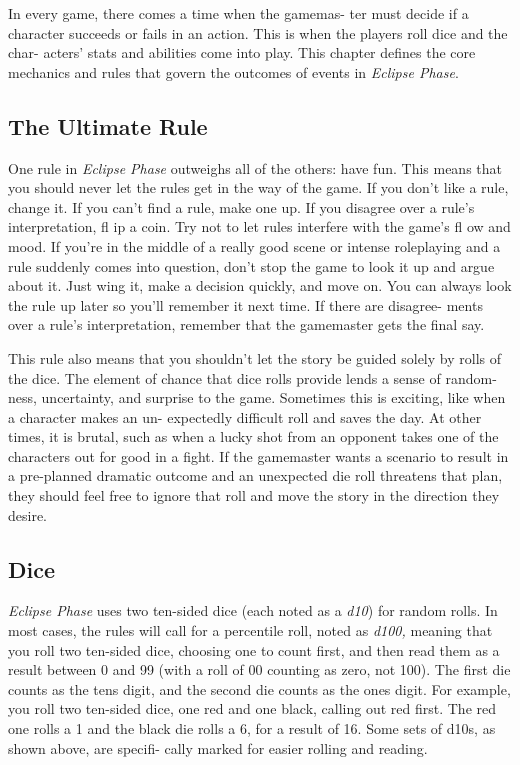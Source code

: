 In every game, there comes a time when the gamemas-
ter must decide if a character succeeds or fails in an 
action. This is when the players roll dice and the char-
acters' stats and abilities come into play. This chapter 
defines the core mechanics and rules that govern the 
outcomes of events in \textit{Eclipse Phase}.

\subsection{The Ultimate Rule}

One rule in \textit{Eclipse Phase} outweighs all of the others: 
have fun. This means that you should never let the 
rules get in the way of the game. If you don't like a 
rule, change it. If you can't find a rule, make one up. 
If you disagree over a rule's interpretation, fl ip a coin. 
Try not to let rules interfere with the game's fl ow and 
mood. If you're in the middle of a really good scene 
or intense roleplaying and a rule suddenly comes into 
question, don't stop the game to look it up and argue 
about it. Just wing it, make a decision quickly, and 
move on. You can always look the rule up later so 
you'll remember it next time. If there are disagree-
ments over a rule's interpretation, remember that the 
gamemaster gets the final say.

This rule also means that you shouldn't let the story 
be guided solely by rolls of the dice. The element of 
chance that dice rolls provide lends a sense of random-
ness, uncertainty, and surprise to the game. Sometimes 
this is exciting, like when a character makes an un-
expectedly difficult roll and saves the day. At other 
times, it is brutal, such as when a lucky shot from an 
opponent takes one of the characters out for good in a 
fight. If the gamemaster wants a scenario to result in a 
pre-planned dramatic outcome and an unexpected die 
roll threatens that plan, they should feel free to ignore 
that roll and move the story in the direction they desire.

\subsection{Dice}

\textit{Eclipse Phase} uses two ten-sided dice (each noted as 
a \textit{d10}) for random rolls. In most cases, the rules will 
call for a percentile roll, noted as \textit{d100,} meaning that 
you roll two ten-sided dice, choosing one to count first, 
and then read them as a result between 0 and 99 (with 
a roll of 00 counting as zero, not 100). The first die 
counts as the tens digit, and the second die counts as 
the ones digit. For example, you roll two ten-sided 
dice, one red and one black, calling out red first. The 
red one rolls a 1 and the black die rolls a 6, for a result 
of 16. Some sets of d10s, as shown above, are specifi-
cally marked for easier rolling and reading.

